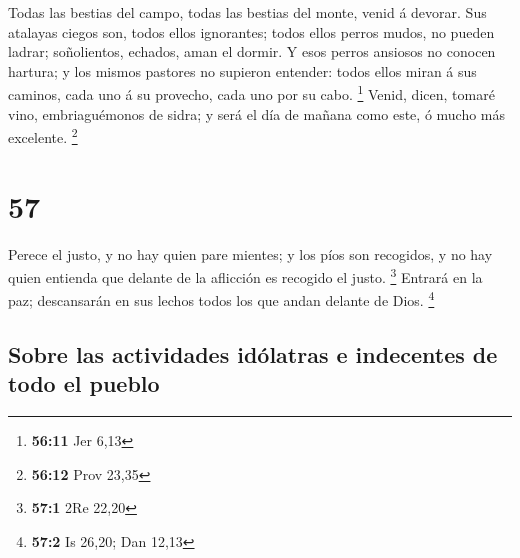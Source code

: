  Todas las bestias del campo, todas las bestias del monte,
venid á devorar.  Sus atalayas ciegos son, todos ellos
ignorantes; todos ellos perros mudos, no pueden ladrar; soñolientos,
echados, aman el dormir.  Y esos perros ansiosos no conocen
hartura; y los mismos pastores no supieron entender: todos ellos miran á
sus caminos, cada uno á su provecho, cada uno por su cabo. \footnote{\textbf{56:11}
  Jer 6,13}  Venid, dicen, tomaré vino, embriaguémonos de
sidra; y será el día de mañana como este, ó mucho más excelente.
\footnote{\textbf{56:12} Prov 23,35}

\hypertarget{section-56}{%
\section{57}\label{section-56}}

 Perece el justo, y no hay quien pare mientes; y los píos
son recogidos, y no hay quien entienda que delante de la aflicción es
recogido el justo. \footnote{\textbf{57:1} 2Re 22,20} 
Entrará en la paz; descansarán en sus lechos todos los que andan delante
de Dios. \footnote{\textbf{57:2} Is 26,20; Dan 12,13}

\hypertarget{sobre-las-actividades-iduxf3latras-e-indecentes-de-todo-el-pueblo}{%
\subsection{Sobre las actividades idólatras e indecentes de todo el
pueblo}\label{sobre-las-actividades-iduxf3latras-e-indecentes-de-todo-el-pueblo}}

